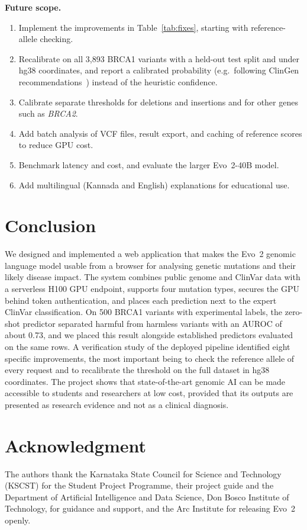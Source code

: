 \documentclass[conference,a4paper]{IEEEtran}
\begin{document}
\textbf{Future scope.}
\begin{enumerate}
\item Implement the improvements in Table~\ref{tab:fixes}, starting with reference-allele checking.
\item Recalibrate on all 3{,}893 BRCA1 variants with a held-out test split and under hg38 coordinates, and report a calibrated probability (e.g.\ following ClinGen recommendations~\cite{pejaver2022svi}) instead of the heuristic confidence.
\item Calibrate separate thresholds for deletions and insertions and for other genes such as \emph{BRCA2}.
\item Add batch analysis of VCF files, result export, and caching of reference scores to reduce GPU cost.
\item Benchmark latency and cost, and evaluate the larger Evo~2-40B model.
\item Add multilingual (Kannada and English) explanations for educational use.
\end{enumerate}

\section{Conclusion}
\label{sec:conclusion}

We designed and implemented a web application that makes the Evo~2 genomic language model usable from a browser for analysing genetic mutations and their likely disease impact. The system combines public genome and ClinVar data with a serverless H100 GPU endpoint, supports four mutation types, secures the GPU behind token authentication, and places each prediction next to the expert ClinVar classification. On 500 BRCA1 variants with experimental labels, the zero-shot predictor separated harmful from harmless variants with an AUROC of about 0.73, and we placed this result alongside established predictors evaluated on the same rows. A verification study of the deployed pipeline identified eight specific improvements, the most important being to check the reference allele of every request and to recalibrate the threshold on the full dataset in hg38 coordinates. The project shows that state-of-the-art genomic AI can be made accessible to students and researchers at low cost, provided that its outputs are presented as research evidence and not as a clinical diagnosis.

\section*{Acknowledgment}
The authors thank the Karnataka State Council for Science and Technology (KSCST) for the Student Project Programme, their project guide and the Department of Artificial Intelligence and Data Science, Don Bosco Institute of Technology, for guidance and support, and the Arc Institute for releasing Evo~2 openly.
\end{document}

